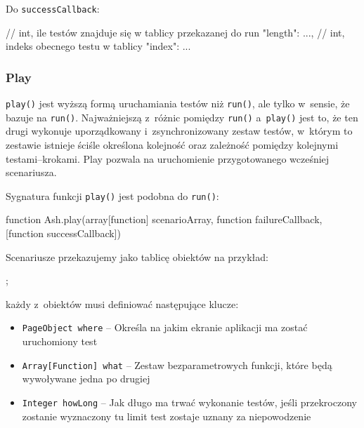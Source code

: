 \documentclass[brudnopis]{xmgr}
\begin{document}
Do \texttt{successCallback}: 

\begin{javascriptcode}
	{
    // int, ile testów znajduje się w tablicy przekazanej do run 
		"length":  ...,
    // int, indeks obecnego testu w tablicy 
		"index": ...
	}
\end{javascriptcode}

\subsubsection{Play} 

\texttt{play()} jest wyższą formą uruchamiania testów niż \texttt{run()}, ale tylko w~sensie, że bazuje na \texttt{run()}. Najważniejszą z~różnic pomiędzy \texttt{run()} a~\texttt{play()} jest to, że ten drugi wykonuje uporządkowany i~zsynchronizowany zestaw testów, w~którym to zestawie istnieje ściśle określona kolejność oraz zależność pomiędzy kolejnymi testami--krokami. Play pozwala na uruchomienie przygotowanego wcześniej scenariusza. 

Sygnatura funkcji \texttt{play()} jest podobna do \texttt{run()}:

\begin{javascriptcode}
function Ash.play(array[function] scenarioArray, 
                  function failureCallback, 
                  [function successCallback]) 
\end{javascriptcode}

Scenariusze przekazujemy jako tablicę obiektów na przykład:

\begin{javascriptcode}
;
\end{javascriptcode}

każdy z~obiektów musi definiować następujące klucze:

\begin{itemize}
  \item \texttt{PageObject where} -- Określa na jakim ekranie aplikacji ma zostać uruchomiony test
  \item \texttt{Array[Function] what} -- Zestaw bezparametrowych funkcji, które będą wywoływane jedna po drugiej 
  \item \texttt{Integer howLong} -- Jak długo ma trwać wykonanie testów, jeśli przekroczony zostanie wyznaczony tu limit test zostaje uznany za niepowodzenie 
\end{itemize}
\end{document}
